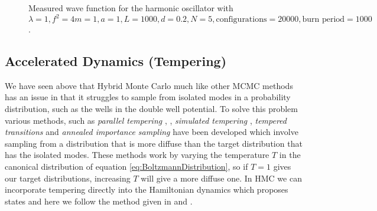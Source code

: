 \documentclass[12pt]{article}
\begin{document}
                \begin{figure}
                    \centering
                    \caption{Measured wave function for the harmonic oscillator with $\lambda = 1, f^2=4 m = 1, a = 1, L = 1000, d = 0.2, N = 5, \text{configurations} = 20000, \text{burn period} = 1000$.}
                    \label{fig:AnharmonicOscillatorIsolatedModes}
                \end{figure}
    \label{sec:Tempering}
    \subsection{Accelerated Dynamics (Tempering)}
    We have seen above that Hybrid Monte Carlo much like other MCMC methods \cite{neal_2011} has an issue in that it struggles to sample from isolated modes in a probability distribution, such as the wells in the double well potential. To solve this problem various methods, such as \textit{parallel tempering} \cite{geyer_1991}, \cite{earl_deem_2005}, \textit{simulated tempering} \cite{marinari_parisi_1992}, \textit{tempered transitions} \cite{neal_1996_b} and \textit{annealed importance sampling} \cite{neal_2001} have been developed which involve sampling from a distribution that is more diffuse than the target distribution that has the isolated modes. These methods work by varying the temperature $T$ in the canonical distribution of equation \ref{eq:BoltzmannDistribution}, so if $T=1$ gives our target distributions, increasing $T$ will give a more diffuse one. In HMC we can incorporate tempering directly into the Hamiltonian dynamics which proposes states and here we follow the method given in \cite{neal_1996_b} and \cite{neal_2011}.  
\end{document}
